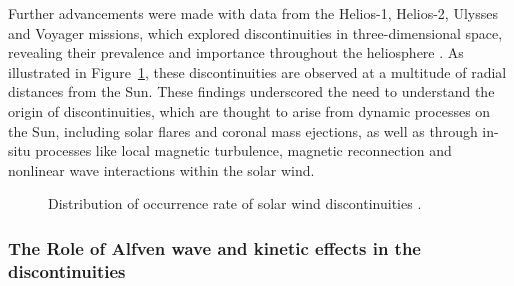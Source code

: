 \documentclass[
  letterpaper,
  DIV=11,
  numbers=noendperiod]{scrartcl}
\begin{document}
Further advancements were made with data from the Helios-1, Helios-2, Ulysses and Voyager missions, which explored discontinuities in three-dimensional space, revealing their prevalence and importance throughout the heliosphere \citep{marianiStatisticalStudyMagnetohydrodynamic1983, tsurutaniNonlinearElectromagneticWaves1997}. As illustrated in Figure~\ref{fig-1}, these discontinuities are observed at a multitude of radial distances from the Sun. These findings underscored the need to understand the origin of discontinuities, which are thought to arise from dynamic processes on the Sun, including solar flares and coronal mass ejections, as well as through in-situ processes like local magnetic turbulence, magnetic reconnection and nonlinear wave interactions within the solar wind.

\begin{figure}


\caption{\label{fig-1}Distribution of occurrence rate of solar wind discontinuities \citep{sodingRadialLatitudinalDependencies2001}.}

\end{figure}%

\subsubsection{The Role of Alfven wave and kinetic effects in the discontinuities}\label{the-role-of-alfven-wave-and-kinetic-effects-in-the-discontinuities}
\end{document}

